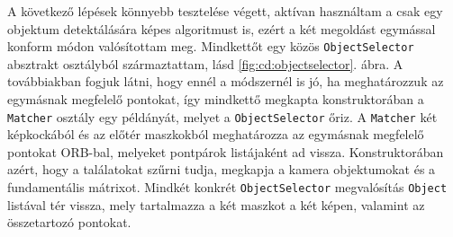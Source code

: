 A következő lépések könnyebb tesztelése végett, aktívan használtam a csak egy objektum detektálására képes algoritmust is, ezért a két megoldást egymással konform módon valósítottam meg. Mindkettőt egy közös \texttt{ObjectSelector} absztrakt osztályból származtattam, lásd \ref{fig:cd:objectselector}. ábra. A továbbiakban fogjuk látni, hogy ennél a módszernél is jó, ha meghatározzuk az egymásnak megfelelő pontokat, így mindkettő megkapta konstruktorában a \texttt{Matcher} osztály egy példányát, melyet a \texttt{ObjectSelector} őriz. A \texttt{Matcher} két képkockából és az előtér maszkokból meghatározza az egymásnak megfelelő pontokat ORB-bal, melyeket pontpárok listájaként ad vissza. Konstruktorában azért, hogy a találatokat szűrni tudja, megkapja a kamera objektumokat és a fundamentális mátrixot. Mindkét konkrét \texttt{ObjectSelector} megvalósítás \texttt{Object} listával tér vissza, mely tartalmazza a két maszkot a két képen, valamint az összetartozó pontokat.


